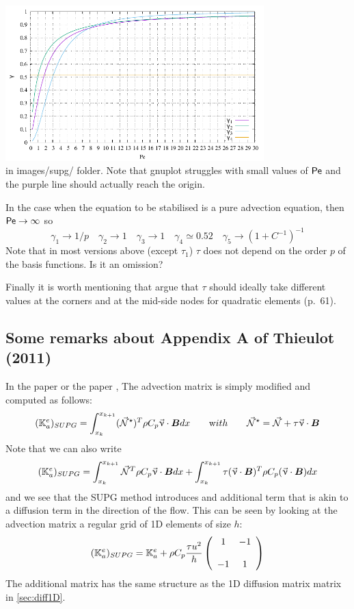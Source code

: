 \begin{center}
\includegraphics[width=10cm]{images/supg/gamma}\\
{\captionfont in images/supg/ folder. Note that gnuplot
struggles with small values of ${\mathsf{Pe}}$ and the purple line should 
actually reach the origin.} 
\end{center}

In the case when the equation to be stabilised is a pure advection equation, 
then ${\mathsf{Pe}}\rightarrow \infty$ so 
\[
\gamma_1 \rightarrow 1/p  \quad
\gamma_2 \rightarrow 1 \quad
\gamma_3 \rightarrow 1 \quad
\gamma_4 \simeq 0.52 \quad
\gamma_5 \rightarrow (1+C^{-1})^{-1} 
\]
Note that in most versions above (except $\tau_1$) 
$\tau$ does not depend on the order $p$ of the basis functions.
Is it an omission?

Finally it is worth mentioning that \textcite{dohu03} argue that $\tau$ should 
ideally take different values at the corners and at the mid-side nodes for quadratic elements (p.~61).

\subsection{Some remarks about Appendix A of Thieulot (2011) \cite{thie11}}
\label{ss:appAthie11}

In the \douar paper \cite{brtf08} or the \fantom paper \cite{thie11},
The advection matrix is simply modified and computed as follows:
\[
({{\mathbb{K}}}_a^e)_{SUPG}
=
\int_{x_k}^{x_{k+1}}   ({\vec {{\mathcal{N}}}}^\star)^T \rho C_p \vec\upnu \cdot {\bm B} dx  
\quad\quad
{\text with}
\quad\quad
{\vec {{\mathcal{N}}}}^\star= {\vec {{\mathcal{N}}}} + \tau \vec \upnu \cdot {\bm B}
\]
Note that we can also write 
\[
({{\mathbb{K}}}_a^e)_{SUPG}
=
\int_{x_k}^{x_{k+1}}   {\vec {{\mathcal{N}}}}^T \rho C_p \vec\upnu \cdot {\bm B} dx  
+
\int_{x_k}^{x_{k+1}}  \tau (\vec \upnu \cdot {\bm B})^T   \rho C_p (\vec\upnu \cdot {\bm B}) dx  
\]
and we see that the SUPG method introduces and additional term that is akin to 
a diffusion term in the direction of the flow.
This can be seen by looking at the advection matrix a regular grid of 1D 
elements of size $h$:
\[
({{\mathbb{K}}}_a^e)_{SUPG}=
{{\mathbb{K}}}_a^e
+
\rho C_p
\frac{\tau u^2}{h}
\left(
\begin{array}{cc}
1 & -1 \\ \\
-1 & 1
\end{array}
\right)
\]
The additional matrix has the same structure as the 1D diffusion matrix matrix in \ref{sec:diff1D}.

